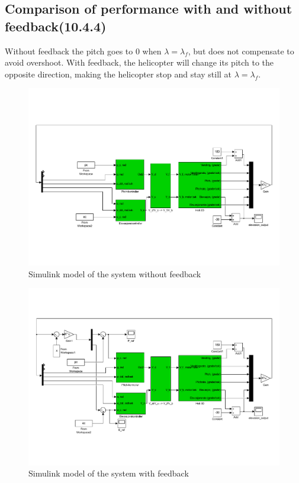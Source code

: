 \subsection{Comparison of performance with and without feedback(10.4.4)}
Without feedback the pitch goes to 0 when $\lambda = \lambda_f$, but does not compensate to avoid overshoot. With feedback, the helicopter will change its pitch to the opposite direction, making the helicopter stop and stay still at $\lambda = \lambda_f$. 

\begin{figure}[H]
	\centering
	\includegraphics[width=\textwidth, trim=2cm 5cm 2cm 2cm]{simulinkmodels/heldag4UnFeed}
	\caption{Simulink model of the system without feedback}
	\label{fig:heldag4UnFeed}
\end{figure}

\begin{figure}[H]
	\centering
	\includegraphics[width=\textwidth, trim=2cm 5cm 2cm 2cm]{simulinkmodels/heldag4medFeed}
	\caption{Simulink model of the system with feedback}
	\label{fig:heldag4medFeed}
\end{figure}

